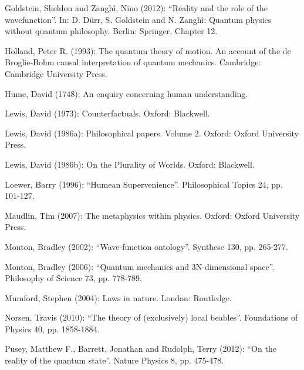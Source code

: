\documentclass[12pt]{article}
\theoremstyle{definition}
\begin{document}
{\vspace{0.3cm}   \noindent  Goldstein, Sheldon and Zangh\`i, Nino (2012): ``Reality and the role of the wavefunction''. In: D. D\"urr, S. Goldstein and N. Zangh\`i: Quantum physics without quantum philosophy. Berlin: Springer. Chapter 12.

\vspace{0.3cm}   \noindent  Holland, Peter R. (1993): The quantum theory of motion. An account of the de Broglie-Bohm causal interpretation of quantum mechanics. Cambridge: Cambridge University Press. 

\vspace{0.3cm}   \noindent  Hume, David (1748): An enquiry concerning human understanding. 

\vspace{0.3cm}   \noindent  Lewis, David (1973): Counterfactuals. Oxford: Blackwell. 

\vspace{0.3cm}   \noindent  Lewis, David (1986a): Philosophical papers. Volume 2. Oxford: Oxford University Press. 

\vspace{0.3cm}   \noindent  Lewis, David (1986b): On the Plurality of Worlds. Oxford: Blackwell. 

\vspace{0.3cm}   \noindent  Loewer, Barry (1996): ``Humean Supervenience''. Philosophical Topics 24, pp. 101-127. 

\vspace{0.3cm}   \noindent  Maudlin, Tim (2007): The metaphysics within physics. Oxford: Oxford University Press.

\vspace{0.3cm}   \noindent  Monton, Bradley (2002): ``Wave-function ontology''. Synthese 130, pp. 265-277. 

\vspace{0.3cm}   \noindent  Monton, Bradley (2006): ``Quantum mechanics and 3N-dimensional space''. Philosophy of Science 73, pp. 778-789.

\vspace{0.3cm}   \noindent  Mumford, Stephen (2004): Laws in nature. London: Routledge. 

\vspace{0.3cm}   \noindent  Norsen, Travis (2010): ``The theory of (exclusively) local beables''. Foundations of Physics 40, pp. 1858-1884.

\vspace{0.3cm}   \noindent  Pusey, Matthew F., Barrett, Jonathan and Rudolph, Terry (2012): ``On the reality of the quantum state''. Nature Physics 8, pp. 475-478. 

}
\end{document}
